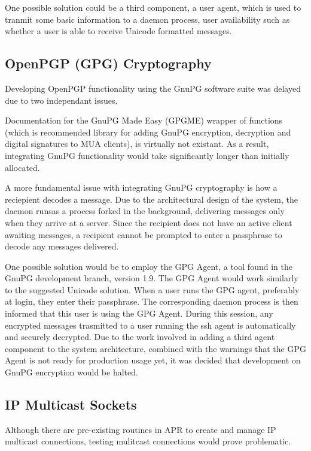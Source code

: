 One possible solution could be a third component, a user
agent, which is used to tranmit some basic information to a daemon
process, user availability such as whether a user is able to receive 
Unicode formatted messages.

\subsection{OpenPGP (GPG) Cryptography}

Developing OpenPGP functionality using the GnuPG software
suite was delayed due to two independant issues.

Documentation for the GnuPG Made Easy (GPGME) wrapper of
functions (which is recommended library for adding GnuPG encryption,
decryption and digital signatures to MUA clients), is virtually not
existant. As a result, integrating GnuPG functionality would take
significantly longer than initially allocated.


A more fundamental issue with integrating GnuPG cryptography 
is how a reciepient decodes a message. Due to the architectural 
design of the system, the daemon runsas a process forked in the 
background, delivering messages only when they arrive at a server. 
Since the recipient does not have an active client awaiting messages, 
a recipient cannot be prompted to enter a passphrase to decode any 
messages delivered. 

One possible solution would be to employ the GPG Agent, a 
tool found in the GnuPG development branch, version 1.9. The GPG
Agent would work similarly to the suggested Unicode solution. When a
user runs the GPG agent, preferably at login, they enter their
passphrase. The corresponding daemon process is then informed that
this user is using the GPG Agent. During this session, any encrypted 
messages trasmitted to a user running the ssh agent is automatically
and securely decrypted. Due to the work involved in adding a third
agent component to the system architecture, combined with the
warnings that the GPG Agent is not ready for production usage yet, it
was decided that development on GnuPG encryption would be halted.

\subsection{IP Multicast Sockets}

Although there are pre-existing routines in APR to create and
manage IP multicast connections, testing mulitcast connections would
prove problematic. 

